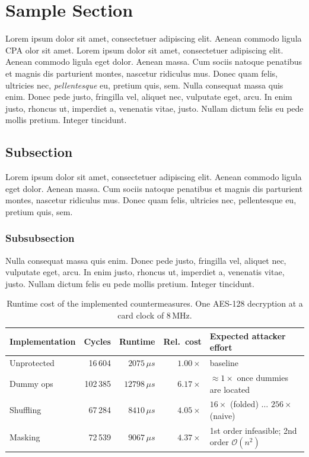 \section{Sample Section}
Lorem ipsum dolor sit amet, consectetuer adipiscing elit. Aenean commodo ligula \ac{CPA} olor sit amet.
Lorem ipsum dolor sit amet, consectetuer adipiscing elit. Aenean commodo ligula eget dolor. Aenean massa. Cum sociis natoque penatibus et magnis dis parturient montes, nascetur ridiculus mus. Donec quam felis, ultricies nec, \textit{pellentesque} eu, pretium quis, sem. Nulla consequat massa quis enim. Donec pede justo, fringilla vel, aliquet nec, vulputate eget, arcu. In enim justo, rhoncus ut, imperdiet a, venenatis vitae, justo. Nullam dictum felis eu pede mollis pretium. Integer tincidunt.


\subsection{Subsection}
Lorem ipsum dolor sit amet, consectetuer adipiscing elit. Aenean commodo ligula eget dolor. Aenean massa. Cum sociis natoque penatibus et magnis dis parturient montes, nascetur ridiculus mus. Donec quam felis, ultricies nec, pellentesque eu, pretium quis, sem.

\subsubsection{Subsubsection}
Nulla consequat massa quis enim. Donec pede justo, fringilla vel, aliquet nec, vulputate eget, arcu. In enim justo, rhoncus ut, imperdiet a, venenatis vitae, justo. Nullam dictum felis eu pede mollis pretium. Integer tincidunt.

\begin{table}[htbp]
\centering
\begin{tabular}{lrrrl}
\toprule
Implementation & Cycles & Runtime & Rel.\ cost & Expected attacker effort \\
\midrule
Unprotected & 16\,604  & $2075$\,$\mu s$  & $1.00\times$ & baseline \\
Dummy ops   & 102\,385 & $12798$\,$\mu s$ & $6.17\times$ & $\approx 1\times$ once dummies are located \\
Shuffling   & 67\,284  & $8410$\,$\mu s$  & $4.05\times$ & $16\times$ (folded) $\dots$ $256\times$ (naive) \\
Masking     & 72\,539  & $9067$\,$\mu s$  & $4.37\times$ & 1st order infeasible; 2nd order $\mathcal{O}(n^2)$ \\
\bottomrule
\end{tabular}
\caption{Runtime cost of the implemented countermeasures. One \ac{AES}-128 decryption at a card clock of $8$\,MHz.}
\label{tab:cm_cost}
\end{table}

